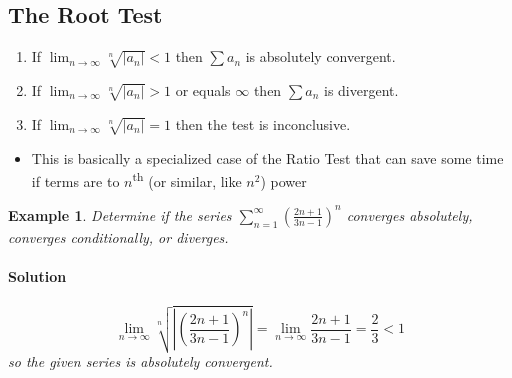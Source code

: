 \documentclass[letterpaper, 11pt, openany]{book}
\theoremstyle{mytheoremstyle}
\theoremstyle{myexamplestyle}
\newtheorem{example}{Example}[section]
\newenvironment{solution}{\paragraph{\sffamily \smaller \fontseries{b}\selectfont Solution}}{\hfill\faSquare}
\begin{document}
\subsection{The Root Test}
\begin{enumerate}
    \item If $\displaystyle \lim_{n \to \infty} \sqrt[n]{|a_{n}|} < 1$ then $\displaystyle \sum a_{n}$ is absolutely convergent.
    \item If $\displaystyle \lim_{n \to \infty} \sqrt[n]{|a_{n}|} > 1$ or equals \(\infty\) then $\displaystyle \sum a_{n}$ is divergent.
    \item If $\displaystyle \lim_{n \to \infty} \sqrt[n]{|a_{n}|} = 1$ then the test is inconclusive. \faFrown
\end{enumerate}
\begin{itemize}
    \item This is basically a specialized case of the Ratio Test that can save some time if terms are to $n$\textsuperscript{th} (or similar, like $n^{2}$) power
\end{itemize}

\begin{example}\label{e:roottestrational}
    Determine if the series $\displaystyle \sum_{n=1}^{\infty} \left( \frac{2n+1}{3n-1} \right)^{n}$ converges absolutely, converges conditionally, or diverges.
    \begin{solution}
        \[\lim_{n \to \infty} \sqrt[n]{\left| \left( \frac{2n+1}{3n-1} \right)^{n} \right|} = \lim_{n \to \infty} \frac{2n+1}{3n-1} = \frac{2}{3} < 1\]
        so the given series is absolutely convergent.
    \end{solution}
\end{example}
\end{document}
